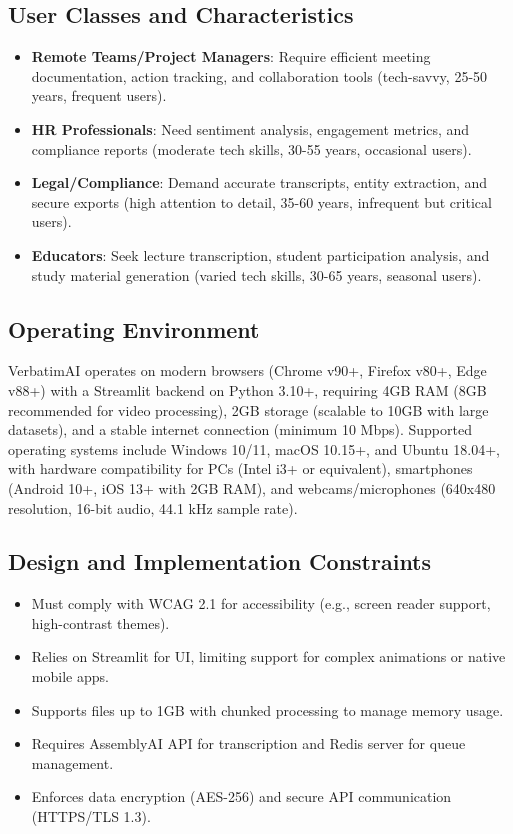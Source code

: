 \documentclass[12pt]{article}
\begin{document}
\subsection{User Classes and Characteristics}
\begin{itemize}
    \item \textbf{Remote Teams/Project Managers}: Require efficient meeting documentation, action tracking, and collaboration tools (tech-savvy, 25-50 years, frequent users).
    \item \textbf{HR Professionals}: Need sentiment analysis, engagement metrics, and compliance reports (moderate tech skills, 30-55 years, occasional users).
    \item \textbf{Legal/Compliance}: Demand accurate transcripts, entity extraction, and secure exports (high attention to detail, 35-60 years, infrequent but critical users).
    \item \textbf{Educators}: Seek lecture transcription, student participation analysis, and study material generation (varied tech skills, 30-65 years, seasonal users).
\end{itemize}

\subsection{Operating Environment}
VerbatimAI operates on modern browsers (Chrome v90+, Firefox v80+, Edge v88+) with a Streamlit backend on Python 3.10+, requiring 4GB RAM (8GB recommended for video processing), 2GB storage (scalable to 10GB with large datasets), and a stable internet connection (minimum 10 Mbps). Supported operating systems include Windows 10/11, macOS 10.15+, and Ubuntu 18.04+, with hardware compatibility for PCs (Intel i3+ or equivalent), smartphones (Android 10+, iOS 13+ with 2GB RAM), and webcams/microphones (640x480 resolution, 16-bit audio, 44.1 kHz sample rate).

\subsection{Design and Implementation Constraints}
\begin{itemize}
    \item Must comply with WCAG 2.1 for accessibility (e.g., screen reader support, high-contrast themes).
    \item Relies on Streamlit for UI, limiting support for complex animations or native mobile apps.
    \item Supports files up to 1GB with chunked processing to manage memory usage.
    \item Requires AssemblyAI API for transcription and Redis server for queue management.
    \item Enforces data encryption (AES-256) and secure API communication (HTTPS/TLS 1.3).
\end{itemize}
\end{document}
